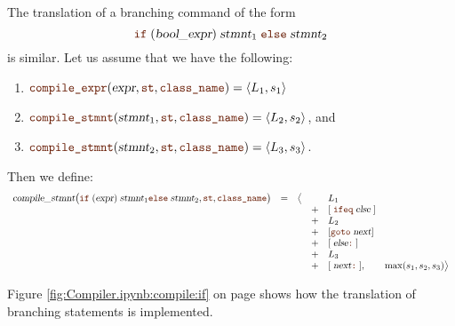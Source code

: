 The translation of a branching command of the form
\[ \mytt{if}\; (\textsl{bool\_expr})\; \textsl{stmnt}_1\; \mytt{else}\; \textsl{stmnt}_2 \]
is similar.  Let us assume that we have the following:
\begin{enumerate}
\item $\mytt{compile\_expr}(\textsl{expr}, \mytt{st}, \mytt{class\_name}) = \pair(L_1, s_1)$
\item $\mytt{compile\_stmnt}(\textsl{stmnt}_1, \mytt{st}, \mytt{class\_name}) = \pair(L_2, s_2)$, and
\item $\mytt{compile\_stmnt}(\textsl{stmnt}_2, \mytt{st}, \mytt{class\_name}) = \pair(L_3, s_3)$.
\end{enumerate}
Then we define:
\[
   \begin{array}[t]{lcccl}
   \textsl{compile\_stmnt}\bigl(\mytt{if}\; (\textsl{expr})\;\textsl{stmnt}_1\mytt{else}\;\textsl{stmnt}_2, \mytt{st}, \mytt{class\_name}\bigr) & = & \bigl\langle & & L_1  \\
   &&& + & [\;\mytt{ifeq}\;\textsl{else}\;] \\
   &&& + & L_2 \\
   &&& + & [\mytt{goto}\;\textsl{next}] \\
   &&& + & [\;\textsl{else}\mytt{:}\;] \\
   &&& + & L_3 \\
   &&& + & [\;\textsl{next}\mytt{:}\;], \qquad \max(s_1, s_2, s_3) \bigr\rangle        
\end{array}
\]

Figure \ref{fig:Compiler.ipynb:compile:if} on page \pageref{fig:Compiler.ipynb:compile:if} shows how the
translation of branching statements is implemented.

